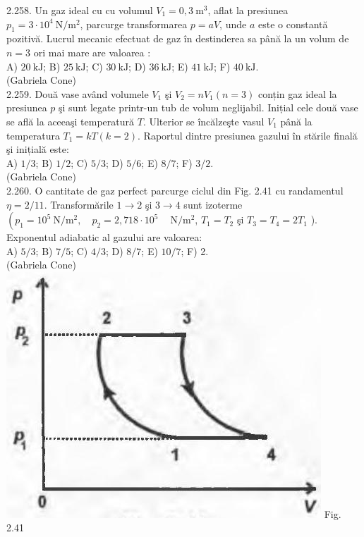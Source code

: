 \documentclass[10pt]{article}
\begin{document}
2.258. Un gaz ideal cu cu volumul $V_{1}=0,3 \mathrm{~m}^{3}$, aflat la presiunea $p_{1}=3 \cdot 10^{4} \mathrm{~N} / \mathrm{m}^{2}$, parcurge transformarea $p=a V$, unde $a$ este o constantă pozitivă. Lucrul mecanic efectuat de gaz în destinderea sa până la un volum de $n=3$ ori mai mare are valoarea :\\ A) $20 \mathrm{~kJ}$; B) $25 \mathrm{~kJ}$; C) $30 \mathrm{~kJ}$; D) $36 \mathrm{~kJ}$; E) $41 \mathrm{~kJ}$; F) $40 \mathrm{~kJ}$.\\ (Gabriela Cone)\\

2.259. Două vase având volumele $V_{1}$ şi $V_{2}=n V_{1}(n=3)$ conțin gaz ideal la presiunea $p$ şi sunt legate printr-un tub de volum neglijabil. Inițial cele două vase se află la aceeaşi temperatură $T$. Ulterior se încălzeşte vasul $V_{1}$ până la temperatura $T_{1}=k T(k=2)$. Raportul dintre presiunea gazului în stările finală şi inițială este:\\ A) $1 / 3$; B) $1 / 2$; C) $5 / 3$; D) $5 / 6$; E) $8 / 7$; F) $3 / 2$.\\ (Gabriela Cone)\\

2.260. O cantitate de gaz perfect parcurge ciclul din Fig. 2.41 cu randamentul $\eta=2 / 11$. Transformările $1 \rightarrow 2$ şi $3 \rightarrow 4$ sunt izoterme $\left(p_{1}=10^{5} \mathrm{~N} / \mathrm{m}^{2}, \quad p_{2}=2,718 \cdot 10^{5} \quad \mathrm{~N} / \mathrm{m}^{2}\right.$, $T_{1}=T_{2}$ şi $T_{3}=T_{4}=2 T_{1}$ ). Exponentul adiabatic al gazului are valoarea:\\ A) $5 / 3$; B) $7 / 5$; C) $4 / 3$; D) $8 / 7$; E) $10 / 7$; F) 2.\\ (Gabriela Cone)\\ \includegraphics[max width=\textwidth, center]{2025_07_01_5b3ff9fa0d508c8e9f17g-132} Fig. 2.41\\
\end{document}
